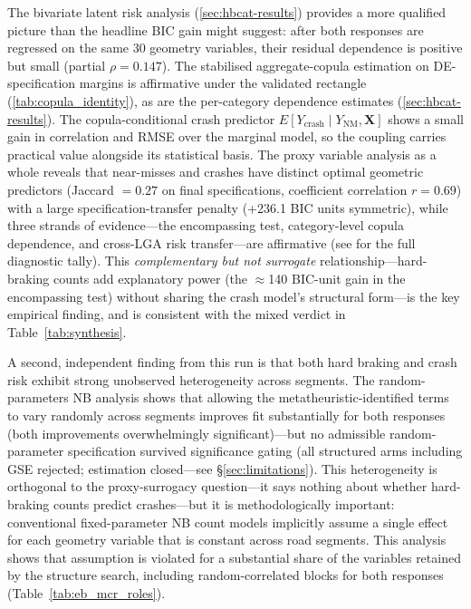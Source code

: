 \documentclass[letterpaper,8pt]{extarticle}  %
\begin{document}
\begin{doublespacing}
\begin{linenumbers}
The bivariate latent risk analysis (\cref{sec:hbcat-results}) provides a more qualified picture than the headline BIC gain might suggest: after both responses are regressed on the same 30 geometry variables, their residual dependence is positive but small (partial $\rho=0.147$). The stabilised aggregate-copula estimation on DE-specification margins is affirmative under the validated rectangle (\cref{tab:copula_identity}), as are the per-category dependence estimates (\cref{sec:hbcat-results}). The copula-conditional crash predictor $E[Y_{\text{crash}} \mid Y_{\text{NM}}, \mathbf{X}]$ shows a small gain in correlation and RMSE over the marginal model, so the coupling carries practical value alongside its statistical basis. The proxy variable analysis as a whole reveals that near-misses and crashes have distinct optimal geometric predictors (Jaccard $=0.27$ on final specifications, coefficient correlation $r=0.69$) with a large specification-transfer penalty (+236.1 BIC units symmetric), while three strands of evidence---the encompassing test, category-level copula dependence, and cross-LGA risk transfer---are affirmative (see  for the full diagnostic tally). This \emph{complementary but not surrogate} relationship---hard-braking counts add explanatory power (the $\approx$140 BIC-unit gain in the encompassing test) without sharing the crash model's structural form---is the key empirical finding, and is consistent with the mixed verdict in Table~\ref{tab:synthesis}.

A second, independent finding from this run is that both hard braking and crash risk exhibit strong unobserved heterogeneity across segments. The random-parameters NB analysis shows that allowing the metatheuristic-identified terms to vary randomly across segments improves fit substantially for both responses (both improvements overwhelmingly significant)---but no admissible random-parameter specification survived significance gating (all structured arms including GSE rejected; estimation closed---see \S\ref{sec:limitations}). This heterogeneity is orthogonal to the proxy-surrogacy question---it says nothing about whether hard-braking counts predict crashes---but it is methodologically important: conventional fixed-parameter NB count models implicitly assume a single effect for each geometry variable that is constant across road segments. This analysis shows that assumption is violated for a substantial share of the variables retained by the structure search, including random-correlated blocks for both responses (Table~\ref{tab:eb_mcr_roles}).


\end{linenumbers}
\end{doublespacing}
\end{document}
